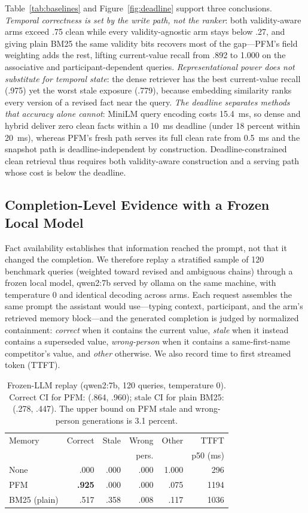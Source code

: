 \documentclass[letterpaper]{article} %
\begin{document}
Table~\ref{tab:baselines} and Figure~\ref{fig:deadline} support three conclusions. \emph{Temporal correctness is set by the write path, not the ranker}: both validity-aware arms exceed .75 clean while every validity-agnostic arm stays below .27, and giving plain BM25 the same validity bits recovers most of the gap---PFM's field weighting adds the rest, lifting current-value recall from .892 to 1.000 on the associative and participant-dependent queries. \emph{Representational power does not substitute for temporal state}: the dense retriever has the best current-value recall (.975) yet the worst stale exposure (.779), because embedding similarity ranks every version of a revised fact near the query. \emph{The deadline separates methods that accuracy alone cannot}: MiniLM query encoding costs 15.4~ms, so dense and hybrid deliver zero clean facts within a 10~ms deadline (under 18 percent within 20~ms), whereas PFM's fresh path serves its full clean rate from 0.5~ms and the snapshot path is deadline-independent by construction. Deadline-constrained clean retrieval thus requires both validity-aware construction and a serving path whose cost is below the deadline.

\subsection{Completion-Level Evidence with a Frozen Local Model}

Fact availability establishes that information reached the prompt, not that it changed the completion. We therefore replay a stratified sample of 120 benchmark queries (weighted toward revised and ambiguous chains) through a frozen local model, qwen2:7b served by ollama on the same machine, with temperature 0 and identical decoding across arms. Each request assembles the same prompt the assistant would use---typing context, participant, and the arm's retrieved memory block---and the generated completion is judged by normalized containment: \emph{correct} when it contains the current value, \emph{stale} when it instead contains a superseded value, \emph{wrong-person} when it contains a same-first-name competitor's value, and \emph{other} otherwise. We also record time to first streamed token (TTFT).

\begin{table}[t]
\centering
\small
\begin{tabular}{@{}lrrrrr@{}}
\toprule
Memory & Correct & Stale & Wrong & Other & TTFT \\
 & & & pers. & & p50 (ms) \\
\midrule
None        & .000 & .000 & .000 & 1.000 & 296 \\
PFM         & \textbf{.925} & .000 & .000 & .075 & 1194 \\
BM25 (plain) & .517 & .358 & .008 & .117 & 1036 \\
\bottomrule
\end{tabular}
\caption{Frozen-LLM replay (qwen2:7b, 120 queries, temperature 0). Correct CI for PFM: (.864, .960); stale CI for plain BM25: (.278, .447). The upper bound on PFM stale and wrong-person generations is 3.1 percent.}
\label{tab:llm}
\end{table}
\end{document}
